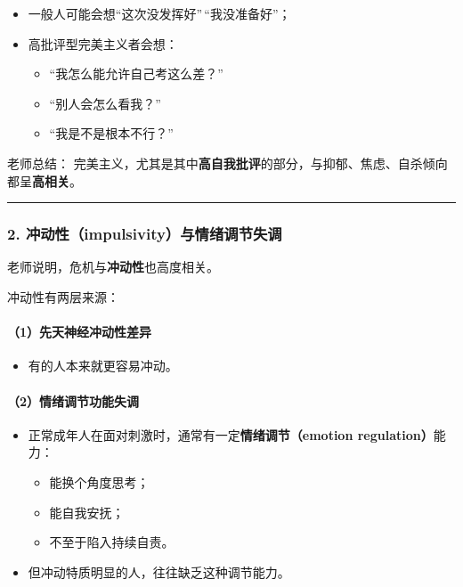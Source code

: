 \documentclass[
  chinese,
  9pt,
  a4paper,
]{ctexart}
\providecommand{\tightlist}{%
  \setlength{\itemsep}{0pt}\setlength{\parskip}{0pt}}
\begin{document}
\begin{itemize}
\item
  一般人可能会想``这次没发挥好''\,``我没准备好''；
\item
  高批评型完美主义者会想：

  \begin{itemize}
  \tightlist
  \item
    ``我怎么能允许自己考这么差？''
  \item
    ``别人会怎么看我？''
  \item
    ``我是不是根本不行？''
  \end{itemize}
\end{itemize}

老师总结：
完美主义，尤其是其中\textbf{高自我批评}的部分，与抑郁、焦虑、自杀倾向都呈\textbf{高相关}。

\begin{center}\rule{0.5\linewidth}{0.5pt}\end{center}

\subsubsection{2.
冲动性（impulsivity）与情绪调节失调}\label{ux51b2ux52a8ux6027impulsivityux4e0eux60c5ux7eeaux8c03ux8282ux5931ux8c03}

老师说明，危机与\textbf{冲动性}也高度相关。

冲动性有两层来源：

\paragraph{（1）先天神经冲动性差异}\label{ux5148ux5929ux795eux7ecfux51b2ux52a8ux6027ux5deeux5f02}

\begin{itemize}
\tightlist
\item
  有的人本来就更容易冲动。
\end{itemize}

\paragraph{（2）情绪调节功能失调}\label{ux60c5ux7eeaux8c03ux8282ux529fux80fdux5931ux8c03}

\begin{itemize}
\item
  正常成年人在面对刺激时，通常有一定\textbf{情绪调节（emotion
  regulation）}能力：

  \begin{itemize}
  \tightlist
  \item
    能换个角度思考；
  \item
    能自我安抚；
  \item
    不至于陷入持续自责。
  \end{itemize}
\item
  但冲动特质明显的人，往往缺乏这种调节能力。
\end{itemize}
\end{document}
